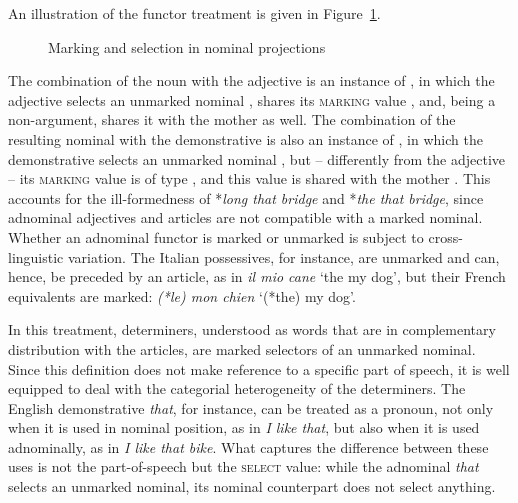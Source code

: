 \documentclass[output=paper
	        ,collection
	        ,collectionchapter
 	        ,biblatex
                ,babelshorthands
                ,newtxmath
                ,draftmode
                ,colorlinks, citecolor=brown
]{langscibook}
\begin{document}
An illustration of the functor treatment is given in Figure~\ref{markyy}.
\begin{figure}
\centering
{}
\caption{\label{markyy} Marking and selection in nominal projections}
\end{figure}
The combination of the noun with the adjective is an instance of , 
in which the adjective selects an unmarked nominal ,  
shares its \textsc{marking} value , and, being a non-argument, 
shares it with the mother as well. 
The combination of the resulting nominal with the demonstrative is also 
an instance of ,
in which the demonstrative selects an unmarked nominal , 
but -- differently from the adjective -- its \textsc{marking} value is of type 
, and this value is shared with the mother .    
This accounts for the ill-formedness of 
*\emph{long that bridge} and *\emph{the that bridge}, since 
adnominal adjectives and articles are not compatible with a marked nominal.  
Whether an adnominal functor is marked or unmarked is subject to cross-linguistic variation. 
The Italian possessives, for instance, are unmarked and can, hence, be preceded 
by an article, as in \emph{il mio cane} `the my dog', but   
their French equivalents are marked: \emph{(*le) mon chien} `(*the) my dog'. 

In this treatment, determiners, understood as words that are in complementary distribution with 
the articles, are marked selectors of an unmarked nominal. Since this definition does not 
make reference to a specific part of speech, it is well equipped to deal with the categorial 
heterogeneity of the determiners. The English demonstrative \emph{that}, for instance, 
can be treated as a pronoun, not only when it is used in nominal position, as in 
\emph{I like that}, but also when it is used adnominally, as in \emph{I like that bike}.   
What captures the difference between these uses is not the part-of-speech but  
the \textsc{select} value: while the adnominal \emph{that} selects an unmarked nominal, 
its nominal counterpart does not select anything.      
\end{document}
